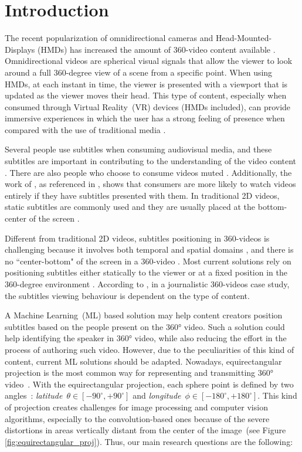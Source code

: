 \section{Introduction}

The recent popularization of omnidirectional cameras and Head-Mounted-Displays (HMDs) has increased the amount of 360-video content available \cite{mendes_2020}. Omnidirectional videos are spherical visual signals that allow the viewer to look around a full 360-degree view of a scene from a specific point. When using HMDs, at each instant in time, the viewer is presented with a viewport that is updated as the viewer moves their head. This type of content, especially when consumed through Virtual Reality~(VR) devices (HMDs included), can provide immersive experiences in which the user has a strong feeling of presence when compared with the use of traditional media \cite{montagud_culture_2020}.

Several people use subtitles when consuming audiovisual media, and these subtitles are important in contributing to the understanding of the video content \cite{brown_subtitles_2017}. There are also people who choose to consume videos muted \cite{hughes_disruptive_2019}. Additionally, the work of \cite{hayati2011effect}, as referenced in \cite{hughes_disruptive_2019}, shows that consumers are more likely to watch videos entirely if they have subtitles presented with them. In traditional 2D videos, static subtitles are commonly used and they are usually placed at the bottom-center of the screen \cite{rothe_dynamic_2018}.

Different from traditional 2D videos, subtitles positioning in 360-videos is challenging because it involves both temporal and spatial domains \cite{agullo2019making}, and there is no ``center-bottom" of the screen in a 360-video \cite{brown_subtitles_2017}. Most current solutions rely on positioning subtitles either statically to the viewer or at a fixed position in the 360-degree environment \cite{mendes_2020}. According to \cite{li_impacts_2018}, in a journalistic 360-videos case study, the subtitles viewing behaviour is dependent on the type of content. 

A Machine Learning~(ML) based solution may help content creators position subtitles based on the people present on the 360° video. Such a solution could help identifying the speaker in 360° video, while also reducing the effort in the process of authoring such video. However, due to the peculiarities of this kind of content, current ML solutions should be adapted. Nowadays, equirectangular projection is the most common way for representing and transmitting 360° video~\cite{yang2018object}. With the equirectangular projection, each sphere point is defined by two angles~\cite{snyder1987map}: \emph{latitude}~$\theta \in [-90^{\circ}, +90^{\circ}]$ and \emph{longitude}~$\phi \in [-180^{\circ}, +180^{\circ}]$. This kind of projection creates challenges for image processing and computer vision algorithms, especially to the convolution-based ones because of the severe distortions in areas vertically distant from the center of the image~(see Figure \ref{fig:equirectangular_proj}). Thus, our main research questions are the following:

